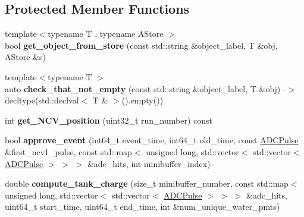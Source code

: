 \subsection*{Protected Member Functions}
\begin{DoxyCompactItemize}
\item 
\hypertarget{classPhaseITreeMaker_a2353d84241001bec77f48242e0d6545d}{{\footnotesize template$<$typename T , typename A\-Store $>$ }\\bool {\bfseries get\-\_\-object\-\_\-from\-\_\-store} (const std\-::string \&object\-\_\-label, T \&obj, A\-Store \&s)}\label{classPhaseITreeMaker_a2353d84241001bec77f48242e0d6545d}

\item 
\hypertarget{classPhaseITreeMaker_a0cec12d12944459177035800d5206d45}{{\footnotesize template$<$typename T $>$ }\\auto {\bfseries check\-\_\-that\-\_\-not\-\_\-empty} (const std\-::string \&object\-\_\-label, T \&obj) -\/$>$ decltype(std\-::declval$<$ T \& $>$().empty())}\label{classPhaseITreeMaker_a0cec12d12944459177035800d5206d45}

\item 
\hypertarget{classPhaseITreeMaker_af70785f235c6dfc44acd219acc49d2ba}{int {\bfseries get\-\_\-\-N\-C\-V\-\_\-position} (uint32\-\_\-t run\-\_\-number) const }\label{classPhaseITreeMaker_af70785f235c6dfc44acd219acc49d2ba}

\item 
\hypertarget{classPhaseITreeMaker_a4d51e9c4ce60a8f932d3719a24c62494}{bool {\bfseries approve\-\_\-event} (int64\-\_\-t event\-\_\-time, int64\-\_\-t old\-\_\-time, const \hyperlink{classADCPulse}{A\-D\-C\-Pulse} \&first\-\_\-ncv1\-\_\-pulse, const std\-::map$<$ unsigned long, std\-::vector$<$ std\-::vector$<$ \hyperlink{classADCPulse}{A\-D\-C\-Pulse} $>$ $>$ $>$ \&adc\-\_\-hits, int minibuffer\-\_\-index)}\label{classPhaseITreeMaker_a4d51e9c4ce60a8f932d3719a24c62494}

\item 
\hypertarget{classPhaseITreeMaker_aa52d9d62bd39a9883fe2d49b8d92de1b}{double {\bfseries compute\-\_\-tank\-\_\-charge} (size\-\_\-t minibuffer\-\_\-number, const std\-::map$<$ unsigned long, std\-::vector$<$ std\-::vector$<$ \hyperlink{classADCPulse}{A\-D\-C\-Pulse} $>$ $>$ $>$ \&adc\-\_\-hits, uint64\-\_\-t start\-\_\-time, uint64\-\_\-t end\-\_\-time, int \&num\-\_\-unique\-\_\-water\-\_\-pmts)}\label{classPhaseITreeMaker_aa52d9d62bd39a9883fe2d49b8d92de1b}

\end{DoxyCompactItemize}
